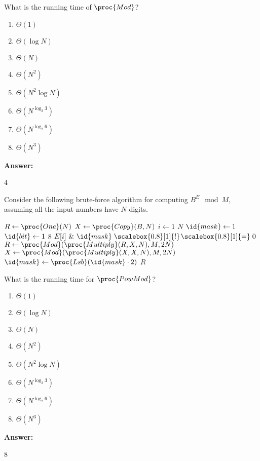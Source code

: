 \documentclass[12pt,twoside]{article}
\newcommand{\isnotequal}{\mathrel{\scalebox{0.8}[1]{!}\hspace*{1pt}\scalebox{0.8}[1]{=}}}
\newcommand{\answer}{
 \par\medskip
 \textbf{Answer:}
}
\newcommand{\answerIk}{ \answer
4
}
\newcommand{\answerIl}{ \answer
8
}
\begin{document}
\begin{problems}
\begin{problemparts}
\problempart {} What is the running time of $\proc{Mod}$?
\begin{enumerate}
  \item $\Theta(1)$
  \item $\Theta(\log N)$
  \item $\Theta(N)$
  \item $\Theta(N^2)$
  \item $\Theta(N^2 \log N)$
  \item $\Theta(N^{\log_2 3})$
  \item $\Theta(N^{\log_2 6})$
  \item $\Theta(N^3)$
\end{enumerate}
\answerIk

\end{problemparts}

Consider the following brute-force algorithm for computing $B^E \mod M$,
assuming all the input numbers have $N$ digits.

\begin{codebox}
\li $R \gets \proc{One}(N)$ 
\li $X \gets \proc{Copy}(B, N)$ 
\li \For $i \gets 1$ \To $N$ \label{li:exp-for1}
\li   \Do
        $\id{mask} \gets 1$
\li     \For $\id{bit} \gets 1$ \To $8$ \label{li:exp-for2}
\li       \Do
            \If $E[i] \textrm{ \& } \id{mask} \isnotequal 0$
\li         \Then
              $R \gets \proc{Mod}(\proc{Multiply}(R, X, N), M, 2N)$
              \label{li:exp-mulmod1}
            \End
\li         $X \gets \proc{Mod}(\proc{Multiply}(X, X, N), M, 2N)$
            \label{li:exp-mulmod2}
\li         $\id{mask} \gets \proc{Lsb}(\id{mask} \cdot 2)$
          \End
      \End
\li \Return $R$
\end{codebox}

\begin{problemparts}

\problempart {} What is the running time for $\proc{PowMod}$?
\begin{enumerate}
  \item $\Theta(1)$
  \item $\Theta(\log N)$
  \item $\Theta(N)$
  \item $\Theta(N^2)$
  \item $\Theta(N^2 \log N)$
  \item $\Theta(N^{\log_2 3})$
  \item $\Theta(N^{\log_2 6})$
  \item $\Theta(N^3)$
\end{enumerate}
\answerIl


\end{problemparts}
\end{problems}
\end{document}
